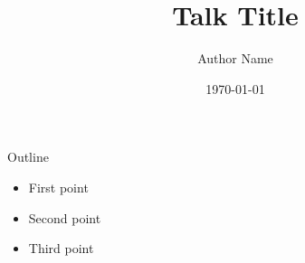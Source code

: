 \documentclass{beamer}
\title{Talk Title}
\author{Author Name}
\date{\today}
\begin{document}
\begin{frame}
  \titlepage
\end{frame}

\begin{frame}{Outline}
  \begin{itemize}
    \item First point
    \item Second point
    \item Third point
  \end{itemize}
\end{frame}
\end{document}
